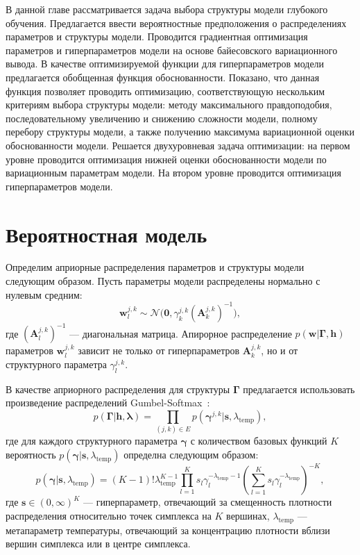 В данной главе рассматривается задача выбора структуры модели глубокого обучения. Предлагается ввести вероятностные предположения о распределениях параметров и структуры модели. 
Проводится градиентная оптимизация параметров и гиперпараметров модели на основе байесовского вариационного вывода.  В качестве оптимизируемой функции для гиперпараметров модели предлагается обобщенная функция обоснованности. Показано, что данная функция позволяет проводить оптимизацию, соответствующую нескольким критериям выбора структуры модели: методу максимального правдоподобия, последовательному увеличению и снижению сложности модели, полному перебору структуры модели, а также получению максимума вариационной оценки обоснованности модели. Решается двухуровневая задача оптимизации: на первом уровне проводится оптимизация нижней оценки обоснованности модели по вариационным параметрам модели. На втором уровне проводится оптимизация гиперпараметров модели.

\section{Вероятностная модель}
Определим априорные распределения параметров и структуры модели следующим образом.
Пусть параметры модели распределены нормально с нулевым средним:
\[
    \mathbf{w}^{j,k}_l \sim \mathcal{N}\bigl(\mathbf{0}, \gamma^{j,k}_k(\mathbf{A}^{j,k}_k)^{-1}\bigr),
\]
где $ (\mathbf{A}^{j,k}_l)^{-1}$ --- диагональная матрица. Апирорное распределение $p(\mathbf{w}|\boldsymbol{\Gamma}, \mathbf{h})$ параметров $\mathbf{w}^{j,k}_l$ зависит не только от гиперпараметров $\mathbf{A}_k^{j,k}$, но и от структурного параметра $\gamma^{j,k}_l$.


В качестве априорного распределения для структуры $\boldsymbol{\Gamma}$ предлагается использовать произведение распределений Gumbel-Softmax~\cite{gs}:
\[
    p(\boldsymbol{\Gamma}|\mathbf{h},\boldsymbol{\lambda}) = \prod_{(j,k) \in E} p(\boldsymbol{\gamma}^{j,k}|\mathbf{s}, \lambda_\text{temp}),
\]
где для каждого структурного параметра $\boldsymbol{\gamma}$ с количеством базовых функций $K$ вероятность $p(\boldsymbol{\gamma}|\mathbf{s}, \lambda_\text{temp})$ определна следующим образом:
\[
    p(\boldsymbol{\gamma}|\mathbf{s}, \lambda_\text{temp}) = (K-1)!\lambda_{\text{temp}}^{K-1}\prod_{l=1}^K s_l\gamma_l^{-\lambda_\text{temp} -1} \left(\sum_{l=1}^K s_l\gamma_l^{-\lambda_\text{temp}}\right)^{-K},
\]
где $\mathbf{s} \in (0,\infty)^K$ --- гиперпараметр, отвечающий за смещенность плотности распределения относительно точек симплекса на $K$ вершинах, $\lambda_{\text{temp}}$ --- метапараметр температуры, отвечающий за концентрацию плотности вблизи вершин симплекса или в центре симплекса.

